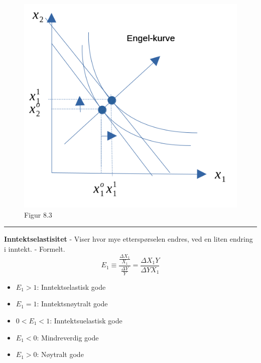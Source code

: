 \documentclass[
  letterpaper,
  DIV=11,
  numbers=noendperiod]{scrartcl}
\providecommand{\tightlist}{%
  \setlength{\itemsep}{0pt}\setlength{\parskip}{0pt}}\usepackage{longtable,booktabs,array}
\begin{document}
\begin{figure}[H]

{\centering \includegraphics[width=1\textwidth,height=\textheight]{drawio/inntel.png}

}

\caption{Figur 8.3}

\end{figure}%

\begin{center}\rule{0.5\linewidth}{0.5pt}\end{center}

\textbf{Inntektselastisitet} - Viser hvor mye etterspørselen endres, ved
en liten endring i inntekt. - Formelt. \begin{equation*}
E_1 \equiv \frac{\frac{\Delta X_{1}}{X_{1}}}{\frac{\Delta Y}{Y}}=\frac{\Delta X_{1} Y }{\Delta Y X_{1}}
\end{equation*}

\begin{itemize}
\tightlist
\item
  \(E_1 > 1\): Inntektselastisk gode
\item
  \(E_1 = 1\): Inntektsnøytralt gode
\item
  \(0 < E_1 < 1\): Inntektsuelastisk gode
\item
  \(E_1 < 0\): Mindreverdig gode
\item
  \(E_1 > 0\): Nøytralt gode
\end{itemize}
\end{document}
